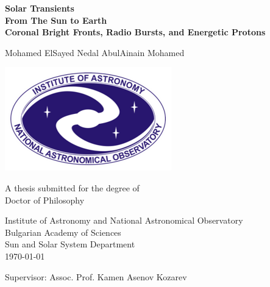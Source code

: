 \begin{titlepage}
    \begin{center}
        \vspace*{1cm}
        
        \Huge
        \textbf{Solar Transients\\From The Sun to Earth\\}
        \huge
        \textbf{Coronal Bright Fronts, Radio Bursts, and Energetic Protons}
        
        \vspace{1.5cm}
        
        \LARGE
        Mohamed ElSayed Nedal AbulAinain Mohamed
        
        \vfill
        \includegraphics[scale=0.7]{extras/ianao_logo.png}
        
        \vfill
        
        A thesis submitted for the degree of\\
        Doctor of Philosophy
        
        \vspace{0.8cm}
        
        \Large
        Institute of Astronomy and National Astronomical Observatory\\Bulgarian Academy of Sciences\\
        Sun and Solar System Department\\
        \today
        
        \vspace{0.8cm}
        
        Supervisor: Assoc. Prof. Kamen Asenov Kozarev
        
    \end{center}
\end{titlepage}
